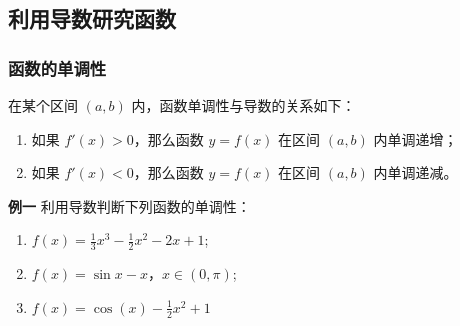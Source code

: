 \documentclass{article}
\begin{document}
\subsection{利用导数研究函数}

\subsubsection{函数的单调性}
在某个区间 \((a, b)\) 内，函数单调性与导数的关系如下：

\begin{enumerate}
    \item 如果 \(f'(x) > 0\)，那么函数 \(y = f(x)\) 在区间 \((a, b)\) 内单调递增；
    \item 如果 \(f'(x) < 0\)，那么函数 \(y = f(x)\) 在区间 \((a, b)\) 内单调递减。
\end{enumerate}

\vspace{1\baselineskip}
\noindent \textbf{例一} \;\;利用导数判断下列函数的单调性：

\begin{enumerate}
    \item \(f(x) = \frac{1}{3}x^3-\frac{1}{2}x^2 -2x+1\);
    \item \(f(x) = \sin x - x\)，\(x \in (0, \pi)\);
    \item \(f(x)=\cos(x)-\frac{1}{2}x^2+1\)
\end{enumerate}
\vspace{6\baselineskip}
\vspace{2\baselineskip}
\end{document}
